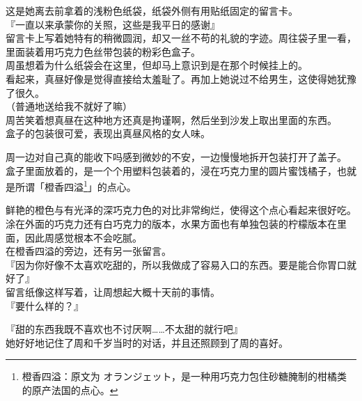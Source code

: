 这是她离去前拿着的浅粉色纸袋，纸袋外侧有用贴纸固定的留言卡。\\

『一直以来承蒙你的关照，这些是我平日的感谢』\\

留言卡上写着她特有的稍微圆润，却又一丝不苟的礼貌的字迹。周往袋子里一看，里面装着用巧克力色丝带包装的粉彩色盒子。\\

周虽想着为什么纸袋会在这里，但却马上意识到是在那个时候挂上的。\\

看起来，真昼好像是觉得直接给太羞耻了。再加上她说过不给男生，这使得她犹豫了很久。\\

（普通地送给我不就好了嘛）\\

周苦笑着想真昼在这种地方还真是拘谨啊，然后坐到沙发上取出里面的东西。\\

盒子的包装很可爱，表现出真昼风格的女人味。

周一边对自己真的能收下吗感到微妙的不安，一边慢慢地拆开包装打开了盖子。\\

盒子里面放着的，是一个个用塑料包装着的，浸在巧克力里的圆片蜜饯橘子，也就是所谓「橙香四溢\footnote{橙香四溢：原文为 {\jpfont オランジェット}，是一种用巧克力包住砂糖腌制的柑橘类的原产法国的点心。}」的点心。

鲜艳的橙色与有光泽的深巧克力色的对比非常绚烂，使得这个点心看起来很好吃。\\

涂在外面的巧克力还有白巧克力的版本，水果方面也有单独包装的柠檬版本在里面，因此周感觉根本不会吃腻。\\

在橙香四溢的旁边，还有另一张留言。\\

『因为你好像不太喜欢吃甜的，所以我做成了容易入口的东西。要是能合你胃口就好了』\\

留言纸像这样写着，让周想起大概十天前的事情。\\

『要什么样的？』

『甜的东西我既不喜欢也不讨厌啊……不太甜的就行吧』\\

她好好地记住了周和千岁当时的对话，并且还照顾到了周的喜好。\\


